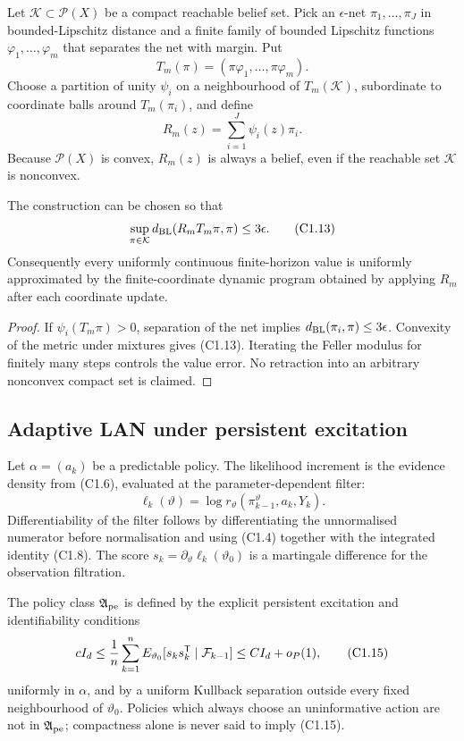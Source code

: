 Let $\mathcal K\subset\mathcal P(X)$ be a compact reachable belief set.  Pick
an $\epsilon$-net $\pi_1,\ldots,\pi_J$ in bounded-Lipschitz distance and a
finite family of bounded Lipschitz functions $\varphi_1,\ldots,\varphi_m$ that
separates the net with margin.  Put
\[
 T_m(\pi)=(\pi\varphi_1,\ldots,\pi\varphi_m).             \tag{C1.11}
\]
Choose a partition of unity $\psi_i$ on a neighbourhood of $T_m(\mathcal K)$,
subordinate to coordinate balls around $T_m(\pi_i)$, and define
\[
 R_m(z)=\sum_{i=1}^J\psi_i(z)\pi_i.                       \tag{C1.12}
\]
Because $\mathcal P(X)$ is convex, $R_m(z)$ is always a belief, even if the
reachable set $\mathcal K$ is nonconvex.

\begin{proposition}
\label{prop:r23-c1-finite}
The construction can be chosen so that
\[
 \sup_{\pi\in\mathcal K}d_{\rm BL}(R_mT_m\pi,\pi)
 \le3\epsilon.                                           \tag{C1.13}
\]
Consequently every uniformly continuous finite-horizon value is uniformly
approximated by the finite-coordinate dynamic program obtained by applying
$R_m$ after each coordinate update.
\end{proposition}

\begin{proof}
If $\psi_i(T_m\pi)>0$, separation of the net implies
$d_{\rm BL}(\pi_i,\pi)\le3\epsilon$.  Convexity of the metric under mixtures
gives (C1.13).  Iterating the Feller modulus for finitely many steps controls
the value error.  No retraction into an arbitrary nonconvex compact set is
claimed.
\end{proof}

\subsection{Adaptive LAN under persistent excitation}

Let $\alpha=(a_k)$ be a predictable policy.  The likelihood increment is the
evidence density from (C1.6), evaluated at the parameter-dependent filter:
\[
 \ell_k(\vartheta)=
 \log r_\vartheta(\pi_{k-1}^{\vartheta},a_k,Y_k).         \tag{C1.14}
\]
Differentiability of the filter follows by differentiating the unnormalised
numerator before normalisation and using (C1.4) together with the integrated
identity (C1.8).  The score
$s_k=\partial_\vartheta\ell_k(\vartheta_0)$ is a martingale difference for the
observation filtration.

The policy class $\mathfrak A_{\rm pe}$ is defined by the explicit persistent
excitation and identifiability conditions
\[
 cI_d\le {1\over n}\sum_{k=1}^n
 E_{\vartheta_0}[s_ks_k^\mathsf T\mid\mathcal F_{k-1}]
 \le CI_d+o_P(1),                                        \tag{C1.15}
\]
uniformly in $\alpha$, and by a uniform Kullback separation outside every
fixed neighbourhood of $\vartheta_0$.  Policies which always choose an
uninformative action are not in $\mathfrak A_{\rm pe}$; compactness alone is
never said to imply (C1.15).


